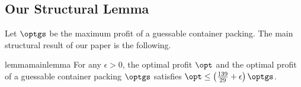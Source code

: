 


\subsection{Our Structural Lemma}
Let $\optgs$ be the maximum profit of a guessable container packing. The main structural result of our paper is the following.

\begin{restatable}{lemma}{mainlemma}
\label{thm:mainthm}
For any $\epsilon > 0$, the optimal profit $\opt$ and the optimal profit of a guessable container packing $\optgs$ satisfies $\opt \le \left(\frac{139}{29}+\epsilon\right)\optgs$.
\end{restatable}

